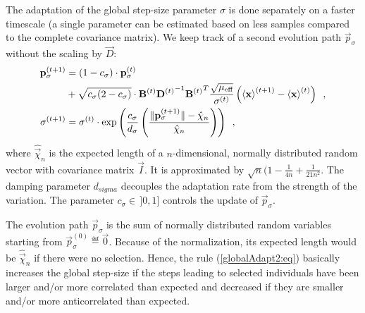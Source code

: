 The adaptation of the global step-size parameter $\sigma$ is done
separately on a faster timescale (a single parameter can be estimated
based on less samples compared to the complete covariance matrix).  We
keep track of a second evolution path $\vec{p}_\sigma$ without the
scaling by $\vec{D}$:
\begin{align}
  \mathbf{p}^{(t+1)}_\sigma&=(1-c_\sigma)\cdot\mathbf{p}^{(t)}_\sigma\nonumber\\
  &+\sqrt{c_\sigma(2-c_\sigma)}\cdot\mathbf{B}^{(t)} {\mathbf{D}^{(t)}}^{-1} {\mathbf{B}^{(t)}}^{T}\frac{\sqrt{\mu_\text{eff}}}{\sigma^{(t)}}
\left(\left<{\mathbf{x}}\right>^{(t+1)}-\left<{\mathbf{x}}\right>^{(t)}\right)\enspace,\\
\sigma^{(t+1)}&=\sigma^{(t)}\cdot\exp\left(\frac{c_\sigma}{d_\sigma}\left(\frac{\|\mathbf{p}^{(t+1)}_\sigma\|
    - \hat{\mathbf{\chi}}_n}{\hat{\mathbf{\chi}}_n}\right)\right)
\enspace,\label{globalAdapt2:eq}
\end{align}
where $\hat{\vec{\chi}}_n$ is the expected length of a
$n$-dimensional, normally distributed random vector with covariance
matrix $\vec I$. It is approximated by
$\sqrt{n}(1-\frac{1}{4n}+\frac{1}{21n^2}$.  The damping parameter
$d_{sigma}$ decouples the adaptation rate from the strength of the
variation.  The parameter $c_\sigma \in\, ]0,1]$ controls the update
of $\vec{p}_\sigma$.

The evolution path $\vec{p}_\sigma$ is the sum of normally distributed
random variables starting from $\vec{p}_\sigma^{(0)}\eqdef\vec 0$.
Because of the normalization, its expected length would be
$\hat{\vec{\chi}}_n$ if there were no selection.  Hence, the rule
(\ref{globalAdapt2:eq}) basically increases the global step-size if
the steps leading to selected individuals have been larger and/or more
correlated than expected and decreased if they are smaller and/or more
anticorrelated than expected.


